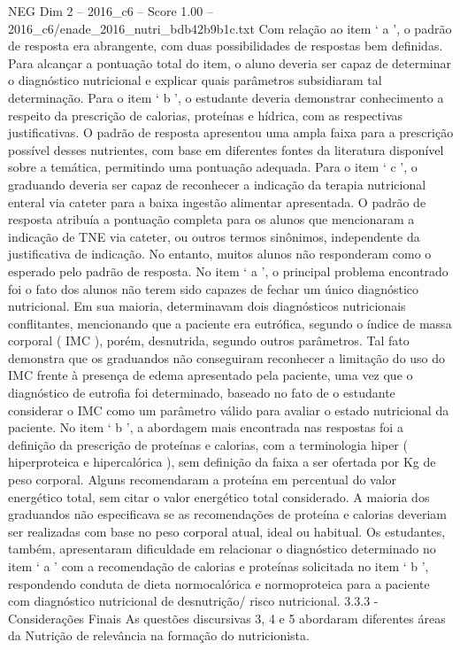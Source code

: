 \begin{textsample}{NEG Dim 2 – 2016\_c6 – Score 1.00 – 2016\_c6/enade\_2016\_nutri\_bdb42b9b1c.txt}
Com relação ao item ‘ a ’, o padrão de resposta era abrangente, com duas possibilidades de respostas bem definidas.
Para alcançar a pontuação total do item, o aluno deveria ser capaz de determinar o diagnóstico nutricional e explicar quais parâmetros subsidiaram tal determinação.
Para o item ‘ b ’, o estudante deveria demonstrar conhecimento a respeito da prescrição de calorias, proteínas e hídrica, com as respectivas justificativas.
O padrão de resposta apresentou uma ampla faixa para a prescrição possível desses nutrientes, com base em diferentes fontes da literatura disponível sobre a temática, permitindo uma pontuação adequada.
Para o item ‘ c ’, o graduando deveria ser capaz de reconhecer a indicação da terapia nutricional enteral via cateter para a baixa ingestão alimentar apresentada.
O padrão de resposta atribuía a pontuação completa para os alunos que mencionaram a indicação de TNE via cateter, ou outros termos sinônimos, independente da justificativa de indicação.
No entanto, muitos alunos não responderam como o esperado pelo padrão de resposta.
No item ‘ a ’, o principal problema encontrado foi o fato dos alunos não terem sido capazes de fechar um único diagnóstico nutricional.
Em sua maioria, determinavam dois diagnósticos nutricionais conflitantes, mencionando que a paciente era eutrófica, segundo o índice de massa corporal ( IMC ), porém, desnutrida, segundo outros parâmetros.
Tal fato demonstra que os graduandos não conseguiram reconhecer a limitação do uso do IMC frente à presença de edema apresentado pela paciente, uma vez que o diagnóstico de eutrofia foi determinado, baseado no fato de o estudante considerar o IMC como um parâmetro válido para avaliar o estado nutricional da paciente.
No item ‘ b ’, a abordagem mais encontrada nas respostas foi a definição da prescrição de proteínas e calorias, com a terminologia hiper ( hiperproteica e hipercalórica ), sem definição da faixa a ser ofertada por Kg de peso corporal.
Alguns recomendaram a proteína em percentual do valor energético total, sem citar o valor energético total considerado.
A maioria dos graduandos não especificava se as recomendações de proteína e calorias deveriam ser realizadas com base no peso corporal atual, ideal ou habitual.
Os estudantes, também, apresentaram dificuldade em relacionar o diagnóstico determinado no item ‘ a ’ com a recomendação de calorias e proteínas solicitada no item ‘ b ’, respondendo conduta de dieta normocalórica e normoproteica para a paciente com diagnóstico nutricional de desnutrição/ risco nutricional. 3.3.3 - Considerações Finais As questões discursivas 3, 4 e 5 abordaram diferentes áreas da Nutrição de relevância na formação do nutricionista.

\end{textsample}
